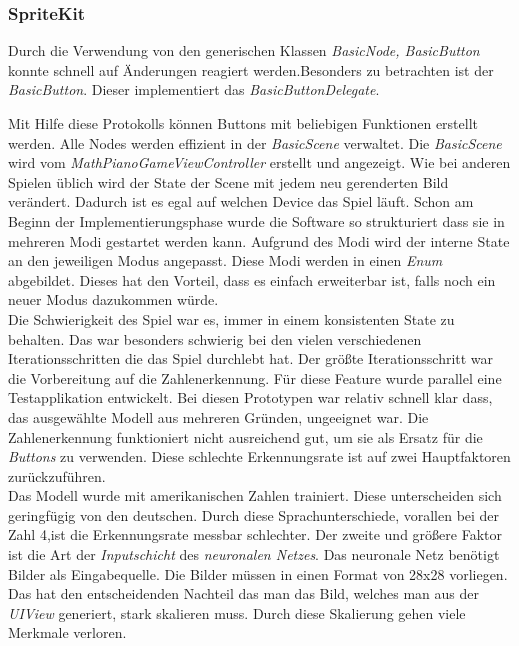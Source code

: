 \subsubsection{SpriteKit}
Durch die Verwendung von den generischen Klassen \textit{BasicNode, BasicButton} konnte schnell auf Änderungen reagiert werden.Besonders zu betrachten ist der \textit{BasicButton}. 
Dieser implementiert das \textit{BasicButtonDelegate}.

Mit Hilfe diese Protokolls können Buttons mit beliebigen Funktionen erstellt werden. 
Alle Nodes werden effizient in der \textit{BasicScene} verwaltet. Die \textit{BasicScene} wird vom \textit{MathPianoGameViewController} erstellt und angezeigt. Wie bei anderen Spielen üblich wird der State der Scene mit jedem neu gerenderten Bild verändert. Dadurch ist es egal auf welchen Device das Spiel läuft.
Schon am Beginn der Implementierungsphase wurde die Software so strukturiert dass sie in mehreren Modi gestartet werden kann. Aufgrund des Modi wird der interne State an den jeweiligen Modus angepasst. Diese Modi werden in einen \textit{Enum} abgebildet. Dieses hat den Vorteil, dass es einfach erweiterbar ist, falls noch ein neuer Modus dazukommen würde. \\
Die Schwierigkeit des Spiel war es, immer in einem konsistenten State zu behalten. Das war besonders schwierig bei den vielen verschiedenen Iterationsschritten die das Spiel durchlebt hat. Der größte Iterationsschritt war die Vorbereitung auf die Zahlenerkennung. Für diese Feature wurde  parallel eine Testapplikation entwickelt. Bei diesen Prototypen war relativ schnell klar dass, das ausgewählte Modell aus mehreren Gründen, ungeeignet war. Die Zahlenerkennung funktioniert nicht ausreichend gut, um sie als Ersatz für die \textit{Buttons} zu verwenden. Diese schlechte Erkennungsrate ist auf zwei Hauptfaktoren zurückzuführen.\\
Das Modell wurde mit amerikanischen Zahlen trainiert. Diese unterscheiden sich geringfügig von den deutschen. Durch diese Sprachunterschiede, vorallen bei der Zahl 4,ist die Erkennungsrate messbar schlechter. Der zweite und größere Faktor ist die Art der \textit{Inputschicht} des \textit{neuronalen Netzes}.
Das neuronale Netz benötigt Bilder als Eingabequelle.
Die Bilder müssen in einen Format von 28x28 vorliegen. Das hat den entscheidenden Nachteil das man das Bild, welches man aus der \textit{UIView} generiert, stark skalieren muss. Durch diese Skalierung gehen viele Merkmale verloren.

